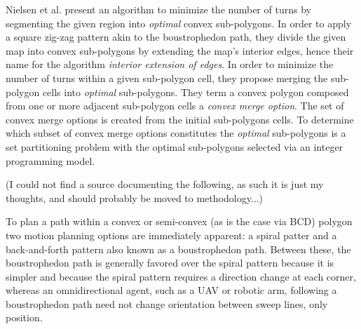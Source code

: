 Nielsen et al. present an algorithm to minimize the number of turns by segmenting the given region into \textit{optimal} convex sub-polygons\cite{IntEdgeExt}.
In order to apply a square zig-zag pattern akin to the boustrophedon path, they divide the given map into convex sub-polygons by extending the map's interior edges, hence their name for the algorithm \textit{interior extension of edges}.
In order to minimize the number of turns within a given sub-polygon cell, they propose merging the sub-polygon cells into \textit{optimal} sub-polygons.
They term a convex polygon composed from one or more adjacent sub-polygon cells a \textit{convex merge option}.
The set of convex merge options is created from the initial sub-polygons cells.
To determine which subset of convex merge options constitutes the \textit{optimal} sub-polygons is a set partitioning problem with the optimal sub-polygons selected via an integer programming model.

(I could not find a source documenting the following, as such it is just my thoughts, and should probably be moved to methodology...)

To plan a path within a convex or semi-convex (as is the case via BCD) polygon two motion planning options are immediately apparent: a spiral patter and a back-and-forth pattern also known as a boustrophedon path.
Between these, the boustrophedon path is generally favored over the spiral pattern because it is simpler and because the spiral pattern requires a direction change at each corner, whereas an omnidirectional agent, such as a UAV or robotic arm, following a boustrophedon path need not change orientation between sweep lines, only position.

